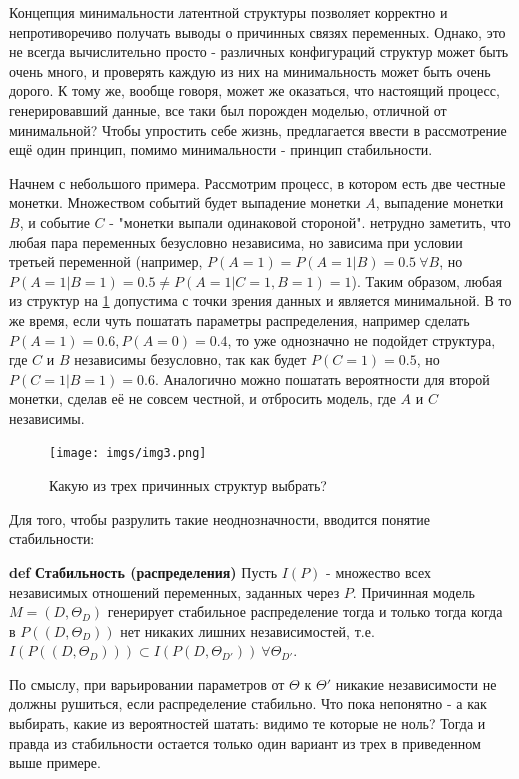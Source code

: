 \documentclass[fleqn]{article}
\def\define#1{\textbf{def} \textbf{#1}}
\begin{document}
Концепция минимальности латентной структуры позволяет корректно и непротиворечиво получать выводы о причинных связях переменных. Однако, это не всегда вычислительно просто - различных конфигураций структур может быть очень много, и проверять каждую из них на минимальность может быть очень дорого. К тому же, вообще говоря, может же оказаться, что настоящий процесс, генерировавший данные, все таки был порожден моделью, отличной от минимальной? Чтобы упростить себе жизнь, предлагается ввести в рассмотрение ещё один принцип, помимо минимальности - принцип стабильности. 

Начнем с небольшого примера. Рассмотрим процесс, в котором есть две честные монетки. Множеством событий будет выпадение монетки $A$, выпадение монетки $B$, и событие $C$ - "монетки выпали одинаковой стороной". нетрудно заметить, что любая пара переменных безусловно независима, но зависима при условии третьей переменной (например, $P(A=1) = P(A=1|B) = 0.5\ \forall B$, но $P(A=1|B=1) =0.5\neq P(A=1|C=1,B=1) = 1$). Таким образом, любая из структур на \ref{fig:choice} допустима с точки зрения данных и является минимальной. В то же время, если чуть пошатать параметры распределения, например сделать $P(A=1) = 0.6, P(A=0)=0.4$, то уже однозначно не подойдет структура, где $C$ и $B$ независимы безусловно, так как будет $P(C=1) = 0.5$, но $P(C=1|B=1) = 0.6$. Аналогично можно пошатать вероятности для второй монетки, сделав её не совсем честной, и отбросить модель, где $A$ и $C$ независимы.

\begin{figure}[h]
	\begin{center}
		\texttt{[image: imgs/img3.png]}
	\end{center}
	\caption{Какую из трех причинных структур выбрать?}
	\label{fig:choice}
\end{figure}

Для того, чтобы разрулить такие неоднозначности, вводится понятие стабильности:

\define{Стабильность (распределения)} Пусть $I(P)$ - множество всех независимых отношений переменных, заданных через $P$. Причинная модель $M = (D, \Theta_D)$ генерирует стабильное распределение тогда и только тогда когда в $P((D, \Theta_D))$ нет никаких лишних независимостей, т.е. $I(P((D, \Theta_D))) \subset I(P(D, \Theta_{D'}))\ \forall \Theta_{D'}$.

По смыслу, при варьировании параметров от $\Theta$ к $\Theta'$ никакие независимости не должны рушиться, если распределение стабильно. Что пока непонятно - а как выбирать, какие из вероятностей шатать: видимо те которые не ноль? Тогда и правда из стабильности остается только один вариант из трех в приведенном выше примере.
\end{document}
